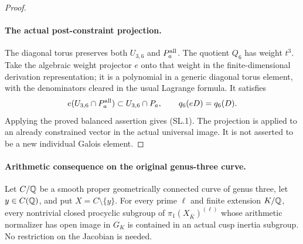 \begin{proof}
\paragraph{The actual post-constraint projection.}
The diagonal torus preserves both $U_{3,6}$ and $P_a^{\rm all}$.
The quotient $Q_6$ has weight $t^3$. Take the algebraic weight
projector $e$ onto that weight in the finite-dimensional
derivation representation; it is a polynomial in a generic
diagonal torus element, with the denominators cleared in the
usual Lagrange formula. It satisfies
\[
 e(U_{3,6}\cap P_a^{\rm all})\subset U_{3,6}\cap P_a,
                    \qquad q_6(eD)=q_6(D).
\]
Applying the proved balanced assertion gives (SL.1).
The projection is applied to an already constrained vector in
the actual universal image. It is not asserted to be a new
individual Galois element.
\end{proof}

\paragraph{Arithmetic consequence on the original genus-three curve.}
Let $C/\mathbb Q$ be a smooth proper geometrically connected curve of
genus three, let $y\in C(\mathbb Q)$, and put $X=C\setminus\{y\}$.
For every prime $\ell$ and finite extension $K/\mathbb Q$, every nontrivial
closed procyclic subgroup of $\pi_1(X_{\overline K})^{(\ell)}$
whose arithmetic normalizer has open image in $G_K$ is contained
in an actual cusp inertia subgroup. No restriction on the
Jacobian is needed.

